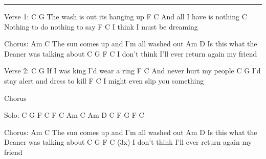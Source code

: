 \noindent\rule{\columnwidth}{1pt}

\begin{lstsong}
Verse 1:
            C               G
The wash is out its hanging up
          F               C
And all I have is nothing
           C
Nothing to do nothing to say
        F               C
I think I must be dreaming 

Chorus:
              Am                    C
The sun comes up and I'm all washed out
                 Am                   D
Is this what the Deaner was talking about
        C               G               F         C
I don't think I'll ever return again my friend

Verse 2:
         C               G
If I was king I'd wear a ring
          F             C
And never hurt my people
         C                      G
I'd stay alert and dress to kill
             F                 C
I might even slip you something

Chorus

Solo: C G F C F C Am C Am D C F G F C

Chorus:
              Am                    C
The sun comes up and I'm all washed out
                Am                   D
Is this what the Deaner was talking about
        C               G               F         C (3x)
I don't think I'll ever return again my friend
\end{lstsong}
\newpage

